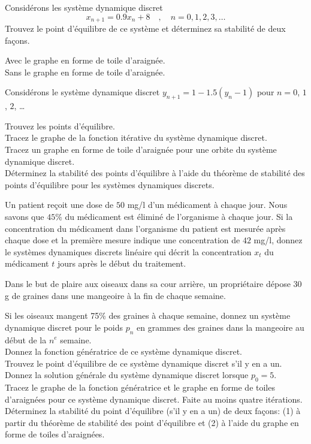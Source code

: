 \begin{question}[\life]
Considérons les système dynamique discret
\[
x_{n+1} = 0.9 x_n + 8 \quad , \quad n=0, 1, 2, 3, \ldots
\]
Trouvez le point d'équilibre de ce système et déterminez sa stabilité de deux
façons.

 Avec le graphe en forme de toile d'araignée.\\
 Sans le graphe en forme de toile d'araignée.
\label{6Q88}
\end{question}

\begin{question}[\life]
Considérons le système dynamique discret $y_{n+1} = 1 -1.5(y_n-1)$
pour $n=0$, $1$, $2$, \ldots

 Trouvez les points d'équilibre.\\
 Tracez le graphe de la fonction itérative du système dynamique
discret.\\
 Tracez un graphe en forme de toile d'araignée pour une orbite du
système dynamique discret.\\
 Déterminez la stabilité des points d'équilibre à l'aide du théorème
de stabilité des points d'équilibre pour les systèmes dynamiques
discrets.
\label{6Q89}
\end{question}

\begin{question}[\life]
Un patient reçoit une dose de $50$ mg/l d'un médicament à chaque jour.
Nous savons que $45$\% du médicament est éliminé de l'organisme à chaque
jour.  Si la concentration du médicament dans l'organisme du
patient est mesurée après chaque dose et la première mesure indique une
concentration de $42$ mg/l, donnez le systèmes dynamiques discrets
linéaire qui décrit la concentration $x_t$ du médicament $t$ jours
après le début du traitement.
\label{6Q90}
\end{question}

\begin{question}
Dans le but de plaire aux oiseaux dans sa cour arrière, un
propriétaire dépose $30$ g de graines dans une mangeoire à la fin de
chaque semaine.

 Si les oiseaux mangent 75\% des graines à chaque semaine,
donnez un système dynamique discret pour le poids $p_n$ en grammes des
graines dans la mangeoire au début de la $n^e$ semaine.\\
 Donnez la fonction génératrice de ce système dynamique discret.\\
 Trouvez le point d'équilibre de ce système dynamique discret
s'il y en a un.\\
 Donnez la solution générale du système dynamique discret lorsque
$p_0 = 5$.\\
 Tracez le graphe de la fonction génératrice et le graphe en
forme de toiles d'araignées pour ce système dynamique discret.  Faite
au moins quatre itérations.\\
 Déterminez la stabilité du point d'équilibre (s'il y en a un) de
deux façons: (1) à partir du théorème de stabilité des point
d'équilibre et (2) à l'aide du graphe en forme de toiles d'araignées.
\label{6Q91}
\end{question}

